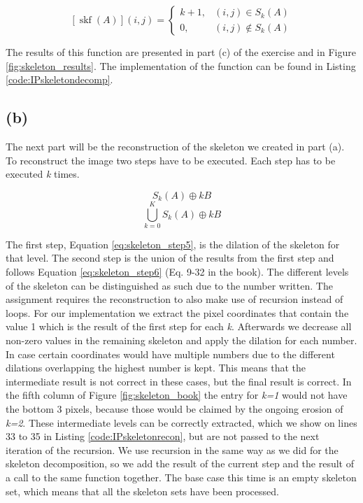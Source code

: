 \documentclass{article}
\begin{document}
\begin{equation}\label{eq:skeleton_encoding}
[\operatorname{skf}(A)](i, j)=\left\{\begin{array}{ll}
k+1, & (i, j) \in S_{k}(A) \\
0, & (i, j) \notin S_{k}(A)
\end{array}\right.
\end{equation}

The results of this function are presented in part (c) of the exercise and in Figure \ref{fig:skeleton_results}. The implementation of the function can be found in  Listing \ref{code:IPskeletondecomp}.

\subsection*{(b)}
The next part will be the reconstruction of the skeleton we created in part (a). To reconstruct the image two steps have to be executed. Each step has to be executed \textit{k} times.

\begin{equation}\label{eq:skeleton_step5}
    S_k(A) \oplus k B
\end{equation}
\begin{equation}\label{eq:skeleton_step6}
    \bigcup_{k=0}^{K}S_k(A) \oplus k B
\end{equation}

The first step, Equation \ref{eq:skeleton_step5}, is the dilation of the skeleton for that level. The second step is the union of the results from the first step and follows Equation \ref{eq:skeleton_step6} (Eq. 9-32 in the book). The different levels of the skeleton can be distinguished as such due to the number written. The assignment requires the reconstruction to also make use of recursion instead of loops. For our implementation we extract the pixel coordinates that contain the value 1 which is the result of the first step for each \textit{k}. Afterwards we decrease all non-zero values in the remaining skeleton and apply the dilation for each number. In case certain coordinates would have multiple numbers due to the different dilations overlapping the highest number is kept. This means that the intermediate result is not correct in these cases, but the final result is correct. In the fifth column of Figure \ref{fig:skeleton_book} the entry for \textit{k=1} would not have the bottom 3 pixels, because those would be claimed by the ongoing erosion of \textit{k=2}. These intermediate levels can be correctly extracted, which we show on lines 33 to 35 in  Listing \ref{code:IPskeletonrecon}, but are not passed to the next iteration of the recursion. We use recursion in the same way as we did for the skeleton decomposition, so we add the result of the current step and the result of a call to the same function together. The base case this time is an empty skeleton set, which means that all the skeleton sets have been processed.
\end{document}
